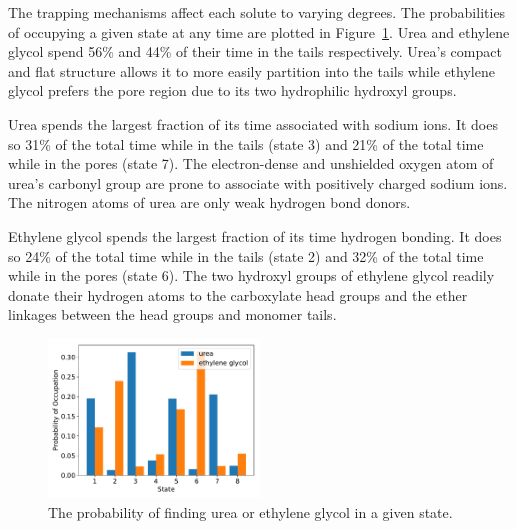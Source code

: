 \documentclass{article}
\begin{document}
  The trapping mechanisms affect each solute to varying degrees. The probabilities
  of occupying a given state at any time are plotted in Figure~\ref{fig:state_probabilities}.
  Urea and ethylene glycol spend 56\% and 44\% of their time in the tails
  respectively. Urea's compact and flat structure allows it to more easily 
  partition into the tails while ethylene glycol prefers the pore region due to 
  its two hydrophilic hydroxyl groups.
  
  Urea spends the largest fraction of its time associated with sodium ions.
  It does so 31\% of the total time while in the tails (state 3) and 21\%
  of the total time while in the pores (state 7). The electron-dense and 
  unshielded oxygen atom of urea's carbonyl group are prone to associate 
  with positively charged sodium ions. The nitrogen atoms of urea are only
  weak hydrogen bond donors.
  
  Ethylene glycol spends the largest fraction of its time hydrogen bonding.
  It does so 24\% of the total time while in the tails (state 2) and 32\% 
  of the total time while in the pores (state 6). The two hydroxyl groups 
  of ethylene glycol readily donate their hydrogen atoms to the carboxylate
  head groups and the ether linkages between the head groups and monomer tails. 
  
  \begin{figure}
  \centering
  \includegraphics[width=0.5\textwidth]{state_probabilities.pdf}
  \caption{The probability of finding urea or ethylene glycol in a given state.}\label{fig:state_probabilities}
  \end{figure}
  
  
  
\end{document}
